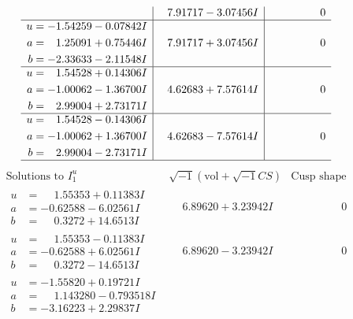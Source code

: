 \documentclass[1p]{elsarticle_modified}
\theoremstyle{definition}
\newcommand{\I}{\sqrt{-1}}
\begin{document}
$$\begin{array}{c|c|c}
 & \phantom{-}7.91717 - 3.07456 I & \phantom{-0.000000 } 0 \\ \hline\begin{aligned}
u &= -1.54259 - 0.07842 I \\
a &= \phantom{-}1.25091 + 0.75446 I \\
b &= -2.33633 - 2.11548 I\end{aligned}
 & \phantom{-}7.91717 + 3.07456 I & \phantom{-0.000000 } 0 \\ \hline\begin{aligned}
u &= \phantom{-}1.54528 + 0.14306 I \\
a &= -1.00062 - 1.36700 I \\
b &= \phantom{-}2.99004 + 2.73171 I\end{aligned}
 & \phantom{-}4.62683 + 7.57614 I & \phantom{-0.000000 } 0 \\ \hline\begin{aligned}
u &= \phantom{-}1.54528 - 0.14306 I \\
a &= -1.00062 + 1.36700 I \\
b &= \phantom{-}2.99004 - 2.73171 I\end{aligned}
 & \phantom{-}4.62683 - 7.57614 I & \phantom{-0.000000 } 0\\
 \hline 
 \end{array}$$\newpage$$\begin{array}{c|c|c}  
\text{Solutions to }I^u_{1}& \I (\text{vol} + \sqrt{-1}CS) & \text{Cusp shape}\\
 \hline 
\begin{aligned}
u &= \phantom{-}1.55353 + 0.11383 I \\
a &= -0.62588 - 6.02561 I \\
b &= \phantom{-}0.3272 + 14.6513 I\end{aligned}
 & \phantom{-}6.89620 + 3.23942 I & \phantom{-0.000000 } 0 \\ \hline\begin{aligned}
u &= \phantom{-}1.55353 - 0.11383 I \\
a &= -0.62588 + 6.02561 I \\
b &= \phantom{-}0.3272 - 14.6513 I\end{aligned}
 & \phantom{-}6.89620 - 3.23942 I & \phantom{-0.000000 } 0 \\ \hline\begin{aligned}
u &= -1.55820 + 0.19721 I \\
a &= \phantom{-}1.143280 - 0.793518 I \\
b &= -3.16223 + 2.29837 I\end{aligned}

\end{array}$$
\end{document}
